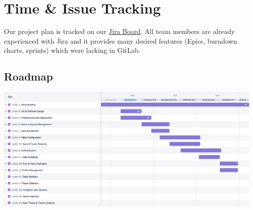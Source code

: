 \section{Time \& Issue Tracking} \label{sec:TimeAndIssueTracking}

Our project plan is tracked on our \href{https://jasstracker-jira.atlassian.net/browse/JASS}{Jira Board}.
All team members are already experienced with Jira and it provides many desired features (Epics, burndown charts, sprints) which were lacking in GitLab.

\subsection{Roadmap}
\includegraphics[width=\textwidth]{resources/jira-roadmap.png}